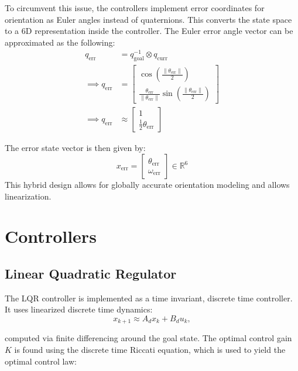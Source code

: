 \documentclass[conference]{IEEEtran}
\begin{document}
To circumvent this issue, the controllers implement error coordinates for orientation
as Euler angles instead of quaternions. This converts the state space to a 6D representation
inside the controller. The Euler error angle vector can be approximated as the following: 
\begin{align}
q_{\text{err}} &= q_{\text{goal}}^{-1} \otimes q_{\text{curr}} \\
\implies q_{\text{err}} &= \begin{bmatrix} \cos\left(\frac{\|\theta_{\text{err}}\|}{2}\right) \\ \frac{\theta_{\text{err}}}{\|\theta_{\text{err}}\|}\sin\left(\frac{\|\theta_{\text{err}}\|}{2}\right) \end{bmatrix} \\
\implies q_{\text{err}} &\approx \begin{bmatrix} 1 \\ \frac{1}{2}\theta_{\text{err}} \end{bmatrix}
\end{align}

The error state vector is then given by:
\begin{equation}
x_{\text{err}} = \begin{bmatrix} \theta_{\text{err}} \\ \omega_{\text{err}} \end{bmatrix} \in \mathbb{R}^6
\end{equation}
This hybrid design allows for globally accurate orientation modeling
and allows linearization.



\section{Controllers}

\subsection{Linear Quadratic Regulator}
The LQR controller is implemented as a time invariant, discrete time controller.
It uses linearized discrete time dynamics:
\begin{equation}
x_{k+1} \approx A_d x_k + B_d u_k,
\end{equation}

computed via finite differencing around the goal state. The optimal control gain \(K\)
is found using the discrete time Riccati equation, which is used to yield the optimal
control law: 
\end{document}
